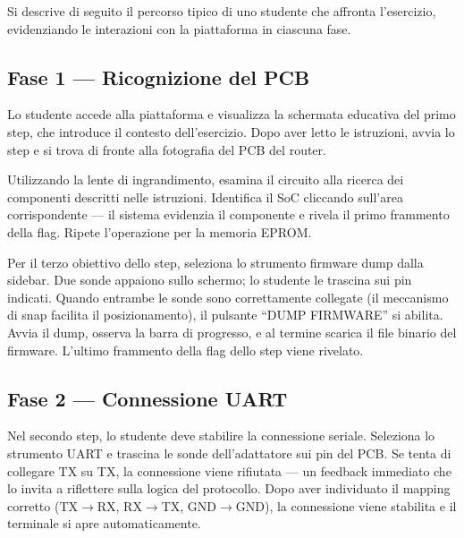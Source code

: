 Si descrive di seguito il percorso tipico di uno studente che affronta l'esercizio, evidenziando le interazioni con la piattaforma in ciascuna fase.

\subsection{Fase 1 --- Ricognizione del PCB}
\label{subsec:fase1-ricognizione}


Lo studente accede alla piattaforma e visualizza la schermata educativa del primo step, che introduce il contesto dell'esercizio. Dopo aver letto le istruzioni, avvia lo step e si trova di fronte alla fotografia del PCB del router.


Utilizzando la lente di ingrandimento, esamina il circuito alla ricerca dei componenti descritti nelle istruzioni. Identifica il SoC cliccando sull'area corrispondente --- il sistema evidenzia il componente e rivela il primo frammento della flag. Ripete l'operazione per la memoria EPROM.

Per il terzo obiettivo dello step, seleziona lo strumento firmware dump dalla sidebar. Due sonde appaiono sullo schermo; lo studente le trascina sui pin indicati. Quando entrambe le sonde sono correttamente collegate (il meccanismo di snap facilita il posizionamento), il pulsante ``DUMP FIRMWARE'' si abilita. Avvia il dump, osserva la barra di progresso, e al termine scarica il file binario del firmware. L'ultimo frammento della flag dello step viene rivelato.

\subsection{Fase 2 --- Connessione UART}
\label{subsec:fase2-uart}


Nel secondo step, lo studente deve stabilire la connessione seriale. Seleziona lo strumento UART e trascina le sonde dell'adattatore sui pin del PCB. Se tenta di collegare TX su TX, la connessione viene rifiutata --- un feedback immediato che lo invita a riflettere sulla logica del protocollo. Dopo aver individuato il mapping corretto (TX$\rightarrow$RX, RX$\rightarrow$TX, GND$\rightarrow$GND), la connessione viene stabilita e il terminale si apre automaticamente.

